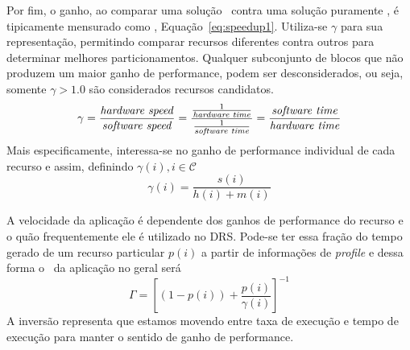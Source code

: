       Por fim, o ganho, ao comparar uma solução \hs\ contra uma solução puramente \software, é tipicamente mensurado como \speedup, Equação~\ref{eq:speedup1}.
      Utiliza-se $ \gamma $ para sua representação, permitindo comparar recursos diferentes contra outros para determinar melhores particionamentos.
      Qualquer subconjunto de blocos que não produzem um maior ganho de performance, podem ser desconsiderados, ou seja, somente $ \gamma > 1.0 $ são considerados recursos candidatos.
      \begin{equation}
         \gamma =
         \frac{
            \textnormal{\textit{hardware speed}}
         }{
            \textnormal{\textit{software speed}}
         }
         =
         \frac{
            \frac{
               1
            } {
               \textnormal{\textit{hardware time}}
            }
         } {
            \frac{
               1
            }{
               \textnormal{\textit{software time}}
            }
         }
         =
         \frac{
            \textnormal{\textit{software time}}
         } {
            \textnormal{\textit{hardware time}}
         } \label{eq:speedup1}
      \end{equation}
      Mais especificamente, interessa-se no ganho de performance individual de cada recurso e assim, definindo $ \gamma(i), i \in \mathcal{C} $
      \begin{equation}
         \gamma(i) = \frac{s(i)}{h(i) + m(i)}
      \end{equation}

      A velocidade da aplicação é dependente dos ganhos de performance do recurso e o quão frequentemente ele é utilizado no DRS.
      Pode-se ter essa fração do tempo gerado de um recurso particular $ p(i) $ a partir de informações de \textit{profile} e dessa forma o \speedup\ da aplicação no geral será
      \begin{equation}
         \Gamma = \left [
         (1 - p(i))
         +
         \frac{
            p(i)
         }{
            \gamma(i)
         } \right ]^{-1}
      \end{equation}
      A inversão representa que estamos movendo entre taxa de execução e tempo de execução para manter o sentido de ganho de performance.

